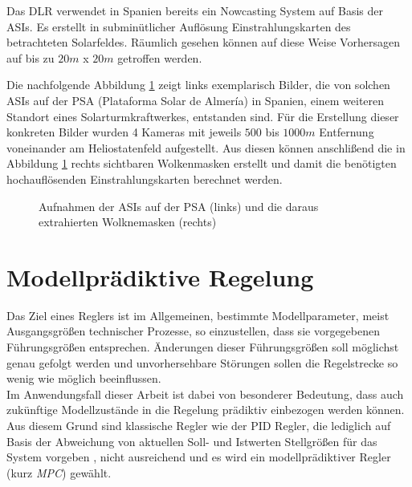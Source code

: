 Das DLR verwendet in Spanien bereits ein Nowcasting System auf Basis der ASIs.
Es erstellt in subminütlicher Auflösung Einstrahlungskarten des betrachteten Solarfeldes.
Räumlich gesehen können auf diese Weise Vorhersagen auf bis zu $20m$ x $20m$ getroffen werden. \cite[S.13]{Samu}\cite{DLRNowcasting}

Die nachfolgende Abbildung \ref{fig_Nowcasting_Kamerabilder} zeigt links exemplarisch Bilder, die von solchen ASIs auf der PSA (Plataforma Solar de Almería) in Spanien, einem weiteren Standort eines Solarturmkraftwerkes, entstanden sind.
Für die Erstellung dieser konkreten Bilder wurden 4 Kameras mit jeweils $500$ bis $1000m$ Entfernung voneinander am Heliostatenfeld aufgestellt.
Aus diesen können anschlißend die in Abbildung \ref{fig_Nowcasting_Kamerabilder} rechts sichtbaren Wolkenmasken erstellt und damit die benötigten hochauflösenden Einstrahlungskarten berechnet werden. \cite{DLRNowcasting}

\begin{figure}[h!]
    \centering
    \setlength{\fboxsep}{1pt}
    \setlength{\fboxrule}{1pt}
\caption[Aufnahmen der ASIs auf der PSA  und die daraus extrahierten Wolknemaske]{Aufnahmen der ASIs auf der PSA (links) und die daraus extrahierten Wolknemasken (rechts) \cite{DLRNowcasting}}
    \label{fig_Nowcasting_Kamerabilder}
\end{figure}


\section{Modellprädiktive Regelung} \label{sec_ModellprädiktiveRegelung}
Das Ziel eines Reglers ist im Allgemeinen, bestimmte Modellparameter, meist Ausgangsgrößen technischer Prozesse, so einzustellen, dass sie vorgegebenen Führungsgrößen entsprechen.
Änderungen dieser Führungsgrößen soll möglichst genau gefolgt werden und unvorhersehbare Störungen sollen die Regelstrecke so wenig wie möglich beeinflussen. \cite{Abel} \\
Im Anwendungsfall dieser Arbeit ist dabei von besonderer Bedeutung, dass auch zukünftige Modellzustände in die Regelung prädiktiv einbezogen werden können.
Aus diesem Grund sind klassische Regler wie der PID Regler, die lediglich auf Basis der Abweichung von aktuellen Soll- und Istwerten Stellgrößen für das System vorgeben \cite[S.408]{Lunze}, nicht ausreichend und es wird ein modellprädiktiver Regler (kurz \textit{MPC}) gewählt.


